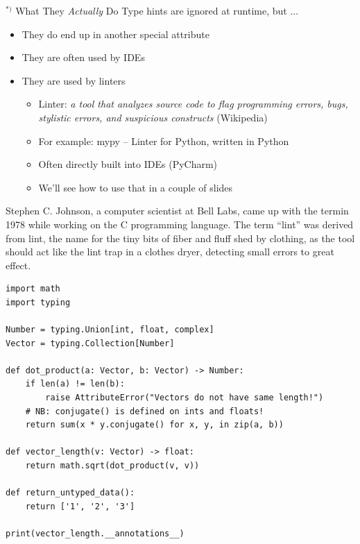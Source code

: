 \begin{frame}[fragile]{$^{*)}$ What They \emph{Actually} Do}
%
\vspace{-3pt}
Type hints are ignored at runtime, but ...
\begin{itemize}
\item They do end up in another special attribute 
\item They are often used by IDEs
\item They are used by linters
	\begin{itemize}
	\item Linter: \emph{a tool that analyzes source code to flag programming errors, bugs, stylistic errors, and suspicious constructs} (Wikipedia)
	\item For example: mypy -- Linter for Python, written in Python
	\item Often directly built into IDEs (\zB PyCharm)
	\item We'll see how to use that in a couple of slides
	\end{itemize}
\end{itemize}
%
\vspace{-3pt}
\begin{hintbox}
\footnotesize
Stephen C. Johnson, a computer scientist at Bell Labs, came up with the termin 1978 while working on the C programming language. The term \enquote{lint} was derived from lint, the name for the tiny bits of fiber and fluff shed by clothing, as the tool should act like the lint trap in a clothes dryer, detecting small errors to great effect.
\end{hintbox}
%
\end{frame}


\begin{frame}[fragile]
%
\begin{codebox}
\begin{verbatim}
import math
import typing

Number = typing.Union[int, float, complex]
Vector = typing.Collection[Number]

def dot_product(a: Vector, b: Vector) -> Number:
    if len(a) != len(b):
        raise AttributeError("Vectors do not have same length!")
    # NB: conjugate() is defined on ints and floats!
    return sum(x * y.conjugate() for x, y, in zip(a, b))

def vector_length(v: Vector) -> float:
    return math.sqrt(dot_product(v, v))

def return_untyped_data():
    return ['1', '2', '3']

print(vector_length.__annotations__)
\end{verbatim}
\end{codebox}
%
\end{frame}

